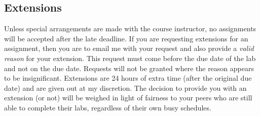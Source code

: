 \documentclass[11pt]{article} %
\begin{document}











\vspace{-.10in}
\subsection*{\textbf{Extensions}}
Unless special arrangements are made with the course instructor, no assignments will be accepted after the late deadline. If you are requesting extensions for an assignment, then you are to email me with your request and also provide a \emph{valid reason} for your extension. This request must come before the due date of the lab and not on the due date. Requests will not be granted where the reason appears to be insignificant. Extensions are 24 hours of extra time (after the original due date) and are given out at my discretion. The decision to provide you with an extension (or not) will be weighed in light of fairness to your peers who are still able to complete their labs, regardless of their own busy schedules. 
\end{document}
